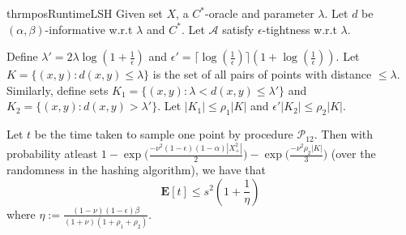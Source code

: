 \documentclass[12pt]{article}
\newcommand{\mb}{\mathbf}
\newcommand{\mc}{\mathcal}
\begin{document}
\begin{restatable}{thrm}{posRuntimeLSH}
\label{thm:posRuntimeLSH}
Given set $X$, a $C^*$-oracle and parameter $\lambda$. Let $d$ be $(\alpha, \beta)$-informative w.r.t $\lambda$ and $C^*$. Let $\mc A$ satisfy $\epsilon$-tightness w.r.t $\lambda$. 

Define $\lambda' = 2\lambda\log(1+\frac{1}{\epsilon})$ and $\epsilon' = \lceil \log(\frac{1}{\epsilon})\rceil (1+\log(\frac{1}{\epsilon}))$. Let $K = \{(x, y) : d(x, y) \le \lambda\}$ is the set of all pairs of points with distance $\le \lambda$. Similarly, define sets $K_1 = \{(x, y): \lambda < d(x, y) \le \lambda'\}$ and $K_2 = \{(x, y): d(x, y) > \lambda'\}$. Let $|K_1| \le \rho_1|K|$ and $\epsilon'|K_2| \le \rho_2|K|$. 

Let $t$ be the time taken to sample one point by procedure $\mc P_{12}$. Then with probability atleast $1- \exp\Big(\frac{-\nu^2(1-\epsilon)(1-\alpha)|X^2_+|}{2}\Big)- \exp\Big(\frac{-\nu^2\rho_2 |K|}{3}\Big)$ (over the randomness in the hashing algorithm), we have that $$\mb E[t] \le s^2(1+\frac{1}{\eta})$$
where $\eta := \frac{(1-\nu)(1-\epsilon)\beta}{(1+\nu)(1+\rho_1+\rho_2)}$. 
\end{restatable}
\end{document}
